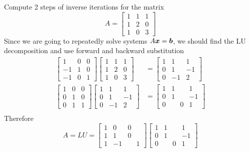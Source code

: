 \begin{example}
Compute 2 steps of inverse iterations for the matrix
$$
A = \begin{bmatrix} 1 & 1 & 1 \\ 1 & 2 & 0 \\ 1 & 0 & 3 \end{bmatrix}
$$
Since we are going to repeatedly solve systems $A \boldsymbol{x} = \boldsymbol{b}$, we should find the LU decomposition and use forward and backward substitution
\begin{align*}
\left[ \begin{array}{rrr} 1 & 0 & 0 \\ -1 & 1 & 0 \\ -1 & 0 & 1 \end{array} \right]
\begin{bmatrix} 1 & 1 & 1 \\ 1 & 2 & 0 \\ 1 & 0 & 3 \end{bmatrix}
&=
\left[ \begin{array}{rrr} 1 & 1 & 1 \\ 0 & 1 & -1 \\ 0 & -1 & 2 \end{array} \right] \\
\left[ \begin{array}{rrr} 1 & 0 & 0 \\ 0 & 1 & 0 \\ 0 & 1 & 1 \end{array} \right]
\left[ \begin{array}{rrr} 1 & 1 & 1 \\ 0 & 1 & -1 \\ 0 & -1 & 2 \end{array} \right]
&=
\left[ \begin{array}{rrr} 1 & 1 & 1 \\ 0 & 1 & -1 \\ 0 & \phantom{+}0 & 1 \end{array} \right] \\
\end{align*}
Therefore
$$
A = LU =
\left[ \begin{array}{rrr} 1 & 0 & 0 \\ 1 & 1 & 0 \\ 1 & -1 & \phantom{+}1 \end{array} \right]
\left[ \begin{array}{rrr} 1 & 1 & 1 \\ 0 & 1 & -1 \\ 0 & \phantom{+}0 & 1 \end{array} \right]
$$
\end{example}
